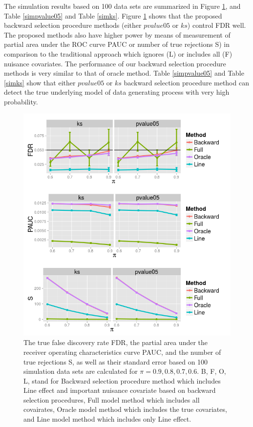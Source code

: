 \documentclass[12pt, letter]{article}\usepackage[]{graphicx}\usepackage[]{color}
\begin{document}
The simulation results based on 100 data sets are summarized in Figure \ref{simfigure},  and Table \ref{simpvalue05} and Table \ref{simks}. Figure \ref{simfigure} shows that the proposed backward selection procedure methods (either $pvalue05$ or $ks$)  control FDR well. The proposed methods also have higher power  by means of  measurement of partial area under the ROC curve PAUC or number of true rejections S) in comparison to the traditional approach  which  ignores (L) or includes all  (F) nuisance covariates. The performance of our backward selection procedure methods is very similar to that of oracle method. Table \ref{simpvalue05} and Table \ref{simks} show that either $pvalue05$ or $ks$ backward selection procedure method can detect the true underlying model of data generating process with very high probability. 

\begin{figure}
\centering
\includegraphics[scale = 0.8]{result.png}
\caption{The true false discovery rate FDR, the partial area under the receiver operating characteristics curve PAUC, and the number of true rejections S, as well as their standard error based on  100 simulation data sets are calculated for  $\pi = 0.9, 0.8, 0.7, 0.6$. B, F, O, L, stand for Backward selection procedure method which includes Line effect and important nuisance covariate based on backward selection procedures, Full model method which includes all covairates, Oracle model method which includes the true covariates, and Line model method which includes only Line effect.}
\label{simfigure}
\end{figure}
\end{document}
